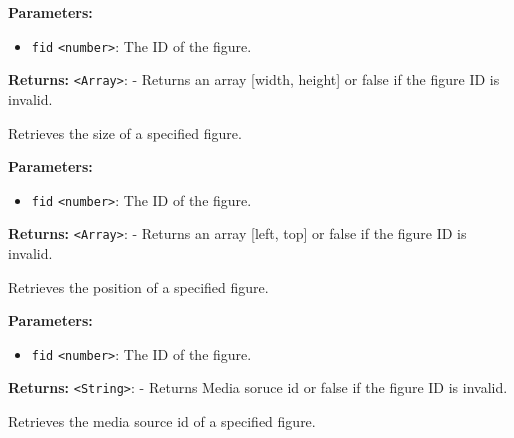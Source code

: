 \documentclass[12pt,a4paper]{article}
\begin{document}
\vspace{5mm}
\noindent {}


\noindent \textbf{Parameters:}
\begin{itemize}
  \item \texttt{fid} \texttt{<number>}: The ID of the figure.
\end{itemize}

\noindent \textbf{Returns:} \texttt{<Array>}: - Returns an array [width, height] or false if the figure ID is invalid.

\noindent Retrieves the size of a specified figure.

\vspace{5mm}
\noindent {}


\noindent \textbf{Parameters:}
\begin{itemize}
  \item \texttt{fid} \texttt{<number>}: The ID of the figure.
\end{itemize}

\noindent \textbf{Returns:} \texttt{<Array>}: - Returns an array [left, top] or false if the figure ID is invalid.

\noindent Retrieves the position of a specified figure.

\vspace{5mm}
\noindent {}


\noindent \textbf{Parameters:}
\begin{itemize}
  \item \texttt{fid} \texttt{<number>}: The ID of the figure.
\end{itemize}

\noindent \textbf{Returns:} \texttt{<String>}: - Returns Media soruce id or false if the figure ID is invalid.

\noindent Retrieves the media source id of a specified figure.

\vspace{5mm}
\noindent {}
\end{document}
